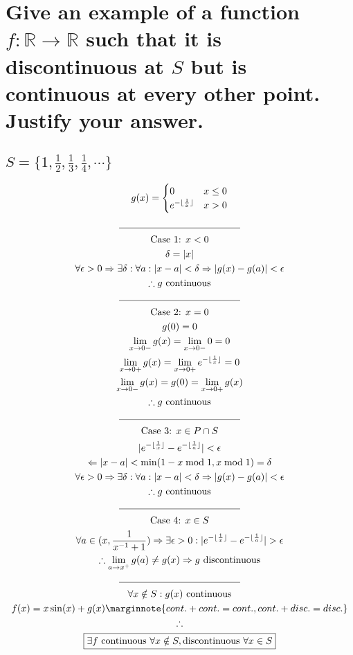 \documentclass[letterpaper]{article}
\DeclarePairedDelimiter{\floor}{\lfloor}{\rfloor}
\DeclarePairedDelimiter\abs{\lvert}{\rvert}
\begin{document}
\section{Give an example of a function $f:\mathbb{R}\rightarrow\mathbb{R}$ such that it is discontinuous at $S$ but is continuous at every other point. Justify your answer.}
\subsection{$S=\{1,\frac{1}{2},\frac{1}{3},\frac{1}{4},\dotsb\}$}
\[ g(x)=\begin{cases} 
      0 & x\leq 0 \\
      e^{-\floor{\frac{1}{x}}} & x>0
   \end{cases}
\]
\begin{gather*}
	\line(1, 0){125} \\
	\text{Case 1: } x<0 \\
	\delta=\abs{x} \\
	\forall \epsilon>0 \Rightarrow\exists\delta:\forall a:\abs{x-a}<\delta\Rightarrow\abs{g(x)-g(a)}<\epsilon \\
	\therefore g\text{ continuous} \\
	\line(1, 0){125} \\
	\text{Case 2: } x=0 \\
	g(0)=0 \\
	\lim_{x\rightarrow0-}g(x)=\lim_{x\rightarrow0-}0=0 \\
	\lim_{x\rightarrow0+}g(x)=\lim_{x\rightarrow0+}e^{-\floor{\frac{1}{x}}}=0 \\
	\lim_{x\rightarrow0-}g(x)=g(0)=\lim_{x\rightarrow0+}g(x) \\
	\therefore g\text{ continuous} \\
	\line(1, 0){125} \\
	\text{Case 3: } x\in P\cap S \\
	\abs{e^{-\floor{\frac{1}{x}}}-e^{-\floor{\frac{1}{a}}}}<\epsilon \\
	\Leftarrow \abs{x-a}<\min(1-x\bmod1,x\bmod1)=\delta \\
	\forall \epsilon>0 \Rightarrow\exists\delta:\forall a:\abs{x-a}<\delta\Rightarrow\abs{g(x)-g(a)}<\epsilon \\
	\therefore g\text{ continuous} \\
	\line(1, 0){125} \\
	\text{Case 4: } x\in S \\
	\forall a\in(x,\frac{1}{x^{-1}+1})\Rightarrow\exists\epsilon>0:\abs{e^{-\floor{\frac{1}{x}}}-e^{-\floor{\frac{1}{a}}}}>\epsilon \\
	\therefore \lim_{a\rightarrow x^+}g(a)\neq g(x)\Rightarrow g \text{ discontinuous} \\
	\line(1, 0){125} \\
	\forall x\notin S: g(x)\text{ continuous} \\
	f(x)=x\sin(x)+g(x) \marginnote{cont.+cont.=cont., cont.+disc.=disc.} \\
	\therefore \\
	\boxed{\exists f \text{ continuous } \forall x\notin S,\text{discontinuous } \forall x\in S}
\end{gather*}
\end{document}
